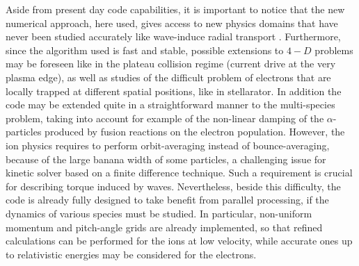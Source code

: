 Aside from present day code capabilities, it is important to notice that the
new numerical approach, here used, gives access to new physics domains that
have never been studied accurately like wave-induce radial transport
\cite{kup91}. Furthermore, since the algorithm used is fast and stable, possible
extensions to $4-D$ problems may be foreseen like in the plateau collision
regime (current drive at the very plasma edge), as well as studies of the
difficult problem of electrons that are locally trapped at different spatial
positions, like in stellarator. In addition the code may be extended quite
in a straightforward manner to the multi-species problem, taking into
account for example of the non-linear damping of the $\alpha$-particles
produced by fusion reactions on the electron population. However, the ion
physics requires to perform orbit-averaging instead of
bounce-averaging, because of the large banana width of some particles, a
challenging issue for kinetic solver based on a finite difference technique.
Such a requirement is crucial for describing torque induced by
waves. Nevertheless, beside this difficulty, the code is already fully
designed to take benefit from parallel processing, if the dynamics of
various species must be studied. In particular, non-uniform momentum
and pitch-angle grids are already implemented, so that refined calculations can be
performed for the ions at low velocity, while accurate ones up to
relativistic energies may be considered for the electrons.
